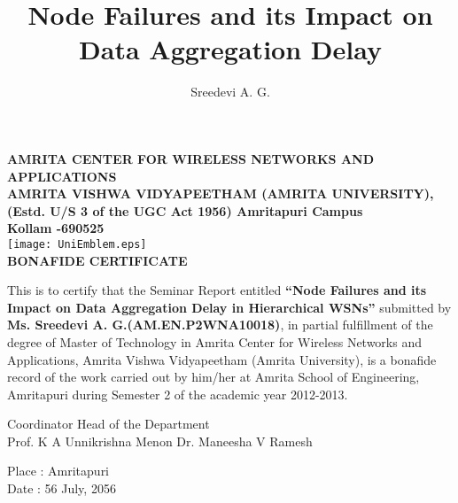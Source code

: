 \documentclass[oneside,12pt]{Classes/CUEDthesisPSnPDF}
\title{Node Failures and its Impact on Data Aggregation Delay}
\author{Sreedevi A. G.}
\begin{document}
\maketitle

\begin{center}
{\normalsize {\bfseries{AMRITA CENTER FOR WIRELESS NETWORKS AND APPLICATIONS	\\[1ex]}}}
{\normalsize {\bfseries{AMRITA VISHWA VIDYAPEETHAM (AMRITA UNIVERSITY),\\[1ex] (Estd. U/S 3 of the UGC Act 1956) Amritapuri  Campus \\[1ex] Kollam -690525\\[1ex]}}}
	\texttt{[image: UniEmblem.eps]}
	\\[1ex]					
				\rmfamily\bfseries\upshape\Large
				BONAFIDE CERTIFICATE \\[2ex] %
\end{center}
		\vspace{1pt}	
\rmfamily\mdseries\upshape\normalsize					
This is to certify that the Seminar Report entitled \textbf{``Node Failures and its Impact on Data Aggregation Delay in Hierarchical WSNs''} submitted by \textbf{Ms. Sreedevi A. G.(AM.EN.P2WNA10018)}, in partial fulfillment of the degree of Master of Technology in Amrita Center for Wireless Networks and Applications, Amrita Vishwa Vidyapeetham (Amrita University), is a bonafide record of the work carried out by him/her  at Amrita School of Engineering, Amritapuri during Semester 2 of the academic year 2012-2013. 
			
\vspace{45pt}
\begin{flushleft}
Coordinator\hspace{200pt} Head of the Department\\
\vspace{3pt}
Prof. K A Unnikrishna Menon\hspace{100pt} Dr. Maneesha V Ramesh\\
\vspace{40pt}
\end{flushleft}
\begin{flushleft}
\vspace{5pt}
Place	:	Amritapuri \\
Date	:	56 July, 2056
\end{flushleft}


\pagebreak
\end{document}
